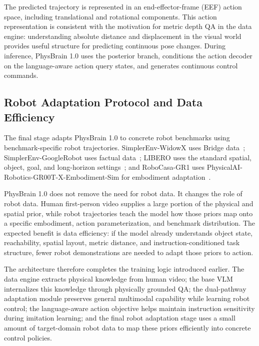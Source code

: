 \documentclass{llmxive}
\begin{document}
The predicted trajectory is represented in an end-effector-frame (EEF) action space, including translational and rotational components. This action representation is consistent with the motivation for metric depth QA in the data engine: understanding absolute distance and displacement in the visual world provides useful structure for predicting continuous pose changes. During inference, PhysBrain 1.0 uses the posterior branch, conditions the action decoder on the language-aware action query states, and generates continuous control commands.

\subsection{Robot Adaptation Protocol and Data Efficiency}

The final stage adapts PhysBrain 1.0 to concrete robot benchmarks using benchmark-specific robot trajectories. SimplerEnv-WidowX uses Bridge data~\cite{Bridgedatav2_2023_CoRL}; SimplerEnv-GoogleRobot uses factual data~\cite{SimplerEnv_2024_CoRL}; LIBERO uses the standard spatial, object, goal, and long-horizon settings~\cite{OpenVLA_2024_CoRL}; and RoboCasa-GR1 uses PhysicalAI-Robotics-GR00T-X-Embodiment-Sim for embodiment adaptation~\cite{RoboCasa_2024_RSS,GR00T_2025_arXiv}.

PhysBrain 1.0 does not remove the need for robot data. It changes the role of robot data. Human first-person video supplies a large portion of the physical and spatial prior, while robot trajectories teach the model how those priors map onto a specific embodiment, action parameterization, and benchmark distribution. The expected benefit is data efficiency: if the model already understands object state, reachability, spatial layout, metric distance, and instruction-conditioned task structure, fewer robot demonstrations are needed to adapt those priors to action.

The architecture therefore completes the training logic introduced earlier. The data engine extracts physical knowledge from human video; the base VLM internalizes this knowledge through physically grounded QA; the dual-pathway adaptation module preserves general multimodal capability while learning robot control; the language-aware action objective helps maintain instruction sensitivity during imitation learning; and the final robot adaptation stage uses a small amount of target-domain robot data to map these priors efficiently into concrete control policies.
\end{document}
